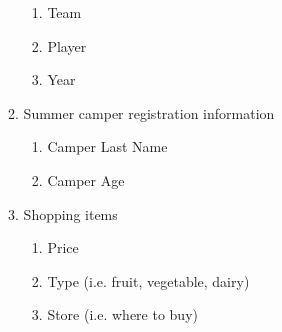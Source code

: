 \documentclass[12pt]{article}
\begin{document}
\begin{enumerate}
\begin{enumerate}
\begin{enumerate}
      \item Team
      \item Player
      \item Year
    \end{enumerate}
    \item Summer camper registration information
    \begin{enumerate}
      \item Camper Last Name
      \item Camper Age
    \end{enumerate}
    \item Shopping items
    \begin{enumerate}
      \item Price
      \item Type (i.e. fruit, vegetable, dairy)
      \item Store (i.e. where to buy)
    \end{enumerate}
  \end{enumerate}
\end{enumerate}
 
\end{document}
